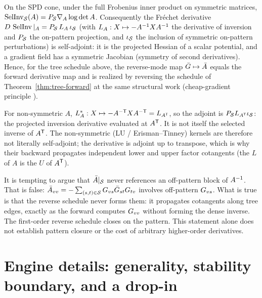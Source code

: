 \begin{theorem}
\label{thm:p0}
On the SPD cone, under the full Frobenius inner product on symmetric
matrices, $\operatorname{SelInv}_{\mathcal{S}}(A) = P_{\mathcal{S}}\nabla_A \log\det A$.
Consequently the Fr\'echet derivative
$D\,\operatorname{SelInv}|_A = P_{\mathcal{S}}\,L_A\,\iota_{\mathcal{S}}$ (with
$L_A: X\mapsto -A^{-1}XA^{-1}$ the derivative of inversion and $P_{\mathcal{S}}$
the on-pattern projection, and $\iota_{\mathcal{S}}$ the inclusion of symmetric
on-pattern perturbations) is self-adjoint: it is the projected Hessian of a
scalar potential, and a gradient field has a symmetric Jacobian (symmetry of
second derivatives).
Hence, for the tree schedule above, the reverse-mode map
$\bar{G}\mapsto\bar{A}$ equals the forward derivative map and is realized
by reversing the schedule of Theorem~\ref{thm:tree-forward} at the same structural work
(cheap-gradient principle \citep{baur1983complexity}).
\end{theorem}

\begin{remark}
\label{rem:transpose}
For non-symmetric $A$,
$L_A^* : X\mapsto -A^{-\mathsf{T}}XA^{-\mathsf{T}} = L_{A^{\mathsf{T}}}$, so the adjoint
is $P_{\mathcal{S}}L_{A^{\mathsf{T}}}\iota_{\mathcal{S}}$: the projected inversion derivative
evaluated at $A^{\mathsf{T}}$. It is not itself the selected inverse of $A^{\mathsf{T}}$. The
non-symmetric (LU / Erisman--Tinney) kernels are therefore not literally
self-adjoint; the derivative is adjoint up to transpose, which is why
their backward propagates independent lower and upper factor cotangents (the
$L$ of $A$ is the $U$ of $A^{\mathsf{T}}$).
\end{remark}

\begin{remark}
It is tempting to argue that $\bar{A}|_{\mathcal{S}}$ never references an
off-pattern block of $A^{-1}$. That is false:
$\bar{A}_{vv} = -\sum_{(s,t)\in\mathcal{S}} G_{vs}\bar{G}_{st}G_{tv}$
involves off-pattern $G_{vs}$. What is true is that the reverse
schedule never forms them: it propagates cotangents along tree edges, exactly
as the forward computes $G_{vv}$ without forming the dense inverse.
The first-order reverse schedule closes on the pattern. This statement alone
does not establish pattern closure or the cost of arbitrary higher-order
derivatives.
\end{remark}

\section{Engine details: generality, stability boundary, and a drop-in}
\label{app:engine}

